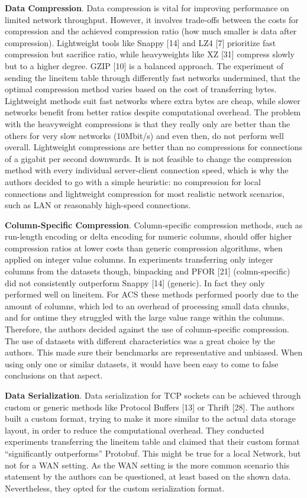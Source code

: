 \documentclass[sigconf]{acmart}
\begin{document}
\textbf{Data Compression}.
Data compression is vital for improving performance on limited network throughput. However, it involves trade-offs between the costs for compression and the achieved compression ratio (how much smaller is data after compression). Lightweight tools like Snappy [14] and LZ4 [7] prioritize fast compression but sacrifice ratio, while heavyweights like XZ [31] compress slowly but to a higher degree. GZIP [10] is a balanced approach.
The experiment of sending the lineitem table through differently fast networks undermined, that the optimal compression method varies based on the cost of transferring bytes. Lightweight methods suit fast networks where extra bytes are cheap, while slower networks benefit from better ratios despite computational overhead. The problem with the heavyweight compressions is that they really only are better than the others for very slow networks (10Mbit/s) and even then, do not perform well overall. Lightweight compressions are better than no compressions for connections of a gigabit per second downwards.
It is not feasible to change the compression method with every individual server-client connection speed, which is why the authors decided to go with a simple heuristic: no compression for local connections and lightweight compression for most realistic network scenarios, such as LAN or reasonably high-speed connections.

\textbf{Column-Specific Compression}.
Column-specific compression methods, such as run-length encoding or delta encoding for numeric columns, should offer higher compression ratios at lower costs than generic compression algorithms, when applied on integer value columns. In experiments transferring only integer columns from the datasets though, binpacking and PFOR [21] (colmn-specific) did not consistently outperform Snappy [14] (generic). In fact they only performed well on lineitem. For ACS these methods performed poorly due to the amount of columns, which led to an overhead of processing small data chunks, and for ontime they struggled with the large value range within the columns. Therefore, the authors decided against the use of column-specific compression. 
The use of datasets with different characteristics was a great choice by the authors. This made sure their benchmarks are representative and unbiased. When using only one or similar datasets, it would have been easy to come to false conclusions on that aspect.

\textbf{Data Serialization}.
Data serialization for TCP sockets can be achieved through custom or generic methods like Protocol Buffers [13] or Thrift [28]. The authors built a custom format, trying to make it more similar to the actual data storage layout, in order to reduce the computational overhead.
They conducted experiments transferring the lineitem table and claimed that their custom format “significantly outperforms” Protobuf. This might be true for a local Network, but not for a WAN setting. As the WAN setting is the more common scenario this statement by the authors can be questioned, at least based on the shown data. Nevertheless, they opted for the custom serialization format.
\end{document}
